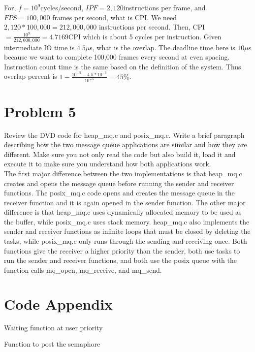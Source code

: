\documentclass{article}
\begin{document}
For, $f=10^9$cycles/second, $IPF=2,120$instructions per frame, and $FPS=100,000$ frames per second, what is CPI. We need $2,120*100,000=212,000,000$ instructions per second. Then, CPI$=\frac{10^9}{212,000,000}=4.7169$CPI which is about 5 cycles per instruction. Given intermediate IO time is $4.5\mu$s, what is the overlap. The deadline time here is $10\mu$s because we want to complete 100,000 frames every second at even spacing. Instruction count time is the same based on the
definition of the system. Thus overlap percent is $1-\frac{10^{-5}-4.5*10^{-6}}{10^{-5}}=45\%$.

\section*{Problem 5}
Review the DVD code for heap\_mq.c and posix\_mq.c. Write a brief paragraph describing how the two message queue applications are similar and how they are different. Make sure you not only read the code but also build it, load it and execute it to make sure you understand how both applications work.\\

The first major difference between the two implementations is that heap\_mq.c creates and opens the message queue before running the sender and receiver functions. The posix\_mq.c code opens and creates the message queue in the receiver function and it is again opened in the sender function. The other major difference is that heap\_mq.c uses dynamically allocated memory to be used as the buffer, while posix\_mq.c uses stack memory. heap\_mq.c also implements the sender and receiver functions
as infinite loops that must be closed by deleting the tasks, while posix\_mq.c only runs through the sending and receiving once. Both functions give the receiver a higher priority than the sender, both use tasks to run the sender and receiver functions, and both use the posix queue with the function calls mq\_open, mq\_receive, and mq\_send.
\appendix
\section*{Code Appendix}
Waiting function at user priority

Function to post the semaphore

\end{document}
